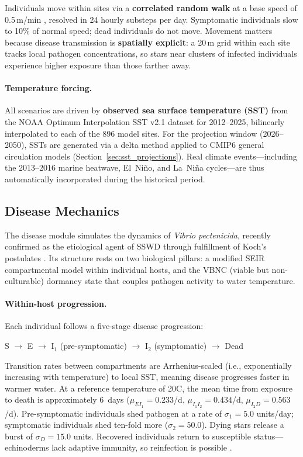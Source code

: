 Individuals move within sites via a \textbf{correlated random walk} at a
base speed of 0.5\,m/min \citep{hodin2021}, resolved in 24 hourly substeps
per day.  Symptomatic individuals slow to 10\% of normal speed; dead
individuals do not move.  Movement matters because disease transmission is
\textbf{spatially explicit}: a 20\,m grid within each site tracks local
pathogen concentrations, so stars near clusters of infected individuals
experience higher exposure than those farther away.

\paragraph{Temperature forcing.}
All scenarios are driven by \textbf{observed sea surface temperature (SST)}
from the NOAA Optimum Interpolation SST v2.1 dataset for 2012--2025,
bilinearly interpolated to each of the 896 model sites.  For the projection
window (2026--2050), SSTs are generated via a delta method applied to CMIP6
general circulation models (Section~\ref{sec:sst_projections}).  Real
climate events---including the 2013--2016 marine heatwave, El~Ni\~no, and
La~Ni\~na cycles---are thus automatically incorporated during the
historical period.

\subsection{Disease Mechanics}
\label{sec:disease}

The disease module simulates the dynamics of \textit{Vibrio pectenicida},
recently confirmed as the etiological agent of SSWD through fulfillment of
Koch's postulates \citep{prentice2025}.  Its structure rests on two
biological pillars: a modified SEIR compartmental model within individual
hosts, and the VBNC (viable but non-culturable) dormancy state that couples
pathogen activity to water temperature.

\paragraph{Within-host progression.}
Each individual follows a five-stage disease progression:
\begin{center}
S $\to$ E $\to$ I$_1$ (pre-symptomatic) $\to$ I$_2$ (symptomatic)
  $\to$ Dead
\end{center}
Transition rates between compartments are Arrhenius-scaled (i.e., exponentially increasing with temperature) to local SST,
meaning disease progresses faster in warmer water.  At a reference
temperature of 20\textdegree C, the mean time from exposure to death is
approximately 6~days ($\mu_{EI_1} = 0.233$/d, $\mu_{I_1 I_2} = 0.434$/d,
$\mu_{I_2 D} = 0.563$/d).  Pre-symptomatic individuals shed pathogen at a
rate of $\sigma_1 = 5.0$ units/day; symptomatic individuals shed ten-fold
more ($\sigma_2 = 50.0$).  Dying stars release a burst of $\sigma_D = 15.0$
units.  Recovered individuals return to susceptible status---echinoderms
lack adaptive immunity, so reinfection is possible \citep{prentice2025}.

